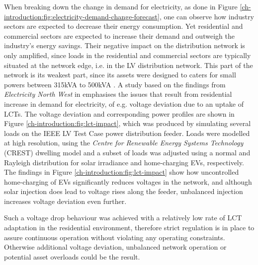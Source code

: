 
When breaking down the change in demand for electricity, as done in Figure \ref{ch-introduction:fig:electricity-demand-change-forecast}, one can observe how industry sectors are expected to decrease their energy consumption.
Yet residential and commercial sectors are expected to increase their demand and outweigh the industry's energy savings.
Their negative impact on the distribution network is only amplified, since loads in the residential and commercial sectors are typically situated at the network edge, i.e. in the LV distribution network.
This part of the network is its weakest part, since its assets were designed to caters for small powers between 315kVA to 500kVA \cite{EDS08-0115}.
A study based on the findings from \textit{Electricity North West} in \cite{ElectricityNorthWestLtd2014} emphasises the issues that result from residential increase in demand for electricity, of e.g. voltage deviation due to an uptake of LCTs.
The voltage deviation and corresponding power profiles are shown in Figure \ref{ch-introduction:fig:lct-impact}, which was produced by simulating several loads on the IEEE LV Test Case power distribution feeder.
Loads were modelled at high resolution, using the \textit{Centre for Renewable Energy Systems Technology} (CREST) dwelling model \cite{Richardson2010a} and a subset of loads was adjusted using a normal and Rayleigh distribution for solar irradiance and home-charging EVs, respectively.
The findings in Figure \ref{ch-introduction:fig:lct-impact} show how uncontrolled home-charging of EVs significantly reduces voltages in the network, and although solar injection does lead to voltage rises along the feeder, unbalanced injection increases voltage deviation even further.



Such a voltage drop behaviour was achieved with a relatively low rate of LCT adaptation in the residential environment, therefore strict regulation is in place to assure continuous operation without violating any operating constraints.
Otherwise additional voltage deviation, unbalanced network operation or potential asset overloads could be the result.

